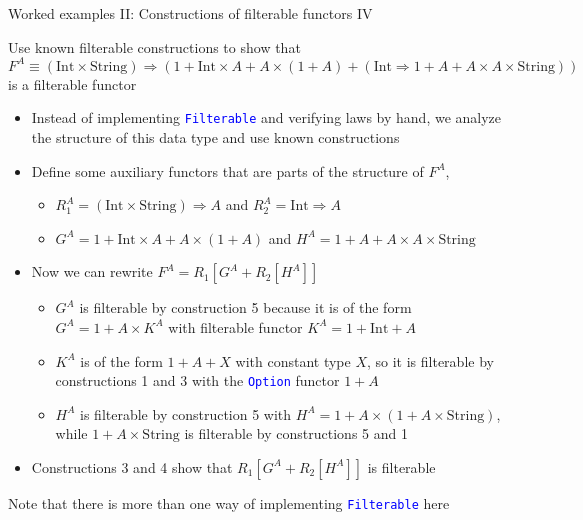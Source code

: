 \documentclass[english]{beamer}
\begin{document}
\begin{frame}{Worked examples II: Constructions of filterable functors IV}

Use known filterable constructions to show that{\footnotesize{} $F^{A}\equiv(\text{Int}\times\text{String})\Rightarrow\left(1+\text{Int}\times A+A\times\left(1+A\right)+\left(\text{Int}\Rightarrow1+A+A\times A\times\text{String}\right)\right)$
}is a filterable functor
\begin{itemize}
\item Instead of implementing \texttt{\textcolor{blue}{\footnotesize{}Filterable}}
and verifying laws by hand, we analyze the structure of this data
type and use known constructions
\item Define some auxiliary functors that are parts of the structure of
$F^{A}$,
\begin{itemize}
\item $R_{1}^{A}=\left(\text{Int}\times\text{String}\right)\Rightarrow A$
and $R_{2}^{A}=\text{Int}\Rightarrow A$ 
\item $G^{A}=1+\text{Int}\times A+A\times\left(1+A\right)$ and $H^{A}=1+A+A\times A\times\text{String}$
\end{itemize}
\item Now we can rewrite {\footnotesize{}$F^{A}=R_{1}\left[G^{A}+R_{2}\left[H^{A}\right]\right]$}{\footnotesize \par}
\begin{itemize}
\item $G^{A}$ is filterable by construction 5 because it is of the form
$G^{A}=1+A\times K^{A}$ with filterable functor $K^{A}=1+\text{Int}+A$
\item $K^{A}$ is of the form $1+A+X$ with constant type $X$, so it is
filterable by constructions 1 and 3 with the \texttt{\textcolor{blue}{\footnotesize{}Option}}
functor $1+A$
\item $H^{A}$ is filterable by construction 5 with $H^{A}=1+A\times\left(1+A\times\text{String}\right)$,
while $1+A\times\text{String}$ is filterable by constructions 5 and
1
\end{itemize}
\item Constructions 3 and 4 show that $R_{1}\left[G^{A}+R_{2}\left[H^{A}\right]\right]$
is filterable
\end{itemize}
Note that there is more than one way of implementing \texttt{\textcolor{blue}{\footnotesize{}Filterable}}
here
\end{frame}
\end{document}
